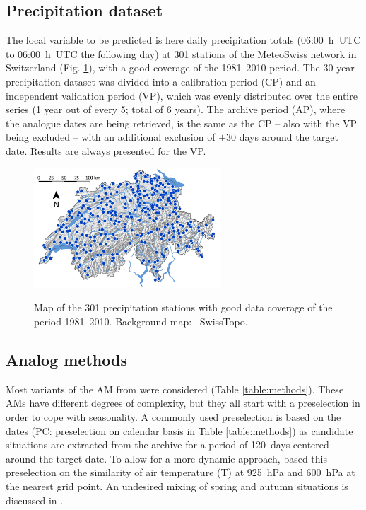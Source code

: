 \documentclass[alpha-refs]{wiley-article}
\begin{document}

\subsection{Precipitation dataset}
\label{sec:precipitation}

The local variable to be predicted is here daily precipitation totals (06:00~h~UTC to 06:00~h~UTC the following day) at 301 stations of the MeteoSwiss network in Switzerland (Fig. \ref{fig:stations}), with a good coverage of the 1981--2010 period. The 30-year precipitation dataset was divided into a calibration period (CP) and an independent validation period (VP), which was evenly distributed over the entire series (1 year out of every 5; total of 6 years). The archive period (AP), where the analogue dates are being retrieved, is the same as the CP -- also with the VP being excluded -- with an additional exclusion of $\pm30$ days around the target date. Results are always presented for the VP.

\begin{figure}
	\includegraphics[width=70mm]{figures/map-stations.jpg}\\
	\caption{Map of the 301 precipitation stations with good data coverage of the period 1981--2010. Background map: \textcopyright\ SwissTopo.}
	\label{fig:stations}
\end{figure}


\subsection{Analog methods}
\label{sec:ams}

Most variants of the AM from \cite{Horton2018b} were considered (Table \ref{table:methods}). These AMs have different degrees of complexity, but they all start with a preselection in order to cope with seasonality. A commonly used preselection is based on the dates (PC: preselection on calendar basis in Table \ref{table:methods}) as candidate situations are extracted from the archive for a period of 120~days centered around the target date. To allow for a more dynamic approach, \citet{BenDaoud2016} based this preselection on the similarity of air temperature (T) at 925~hPa and 600~hPa at the nearest grid point. An undesired mixing of spring and autumn situations is discussed in \citet{Caillouet2016}. 
\end{document}
